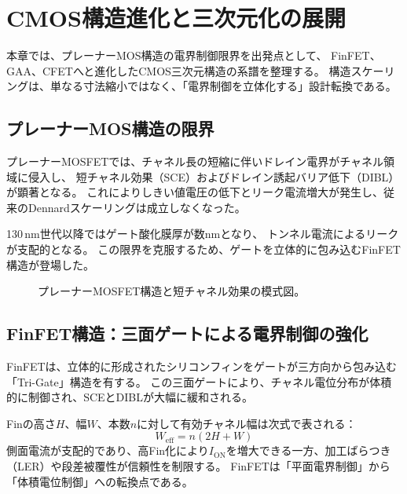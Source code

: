 \chapter{CMOS構造進化と三次元化の展開}

本章では、プレーナーMOS構造の電界制御限界を出発点として、  
FinFET、GAA、CFETへと進化したCMOS三次元構造の系譜を整理する。  
構造スケーリングは、単なる寸法縮小ではなく、「電界制御を立体化する」設計転換である。

\section{プレーナーMOS構造の限界}
プレーナーMOSFETでは、チャネル長の短縮に伴いドレイン電界がチャネル領域に侵入し、  
短チャネル効果（SCE）およびドレイン誘起バリア低下（DIBL）が顕著となる。  
これによりしきい値電圧の低下とリーク電流増大が発生し、従来のDennardスケーリングは成立しなくなった。

130\,nm世代以降ではゲート酸化膜厚が数\si{\nano\meter}となり、  
トンネル電流によるリークが支配的となる。  
この限界を克服するため、ゲートを立体的に包み込むFinFET構造が登場した。

\begin{figure}[t]
  \centering
  
  \caption{プレーナーMOSFET構造と短チャネル効果の模式図。}
\end{figure}

\section{FinFET構造：三面ゲートによる電界制御の強化}
FinFETは、立体的に形成されたシリコンフィンをゲートが三方向から包み込む「Tri-Gate」構造を有する。  
この三面ゲートにより、チャネル電位分布が体積的に制御され、SCEとDIBLが大幅に緩和される。  

Finの高さ$H$、幅$W$、本数$n$に対して有効チャネル幅は次式で表される：
\[
W_{\mathrm{eff}} = n(2H + W)
\]
側面電流が支配的であり、高Fin化により$I_{\mathrm{ON}}$を増大できる一方、加工ばらつき（LER）や段差被覆性が信頼性を制限する。  
FinFETは「平面電界制御」から「体積電位制御」への転換点である。



